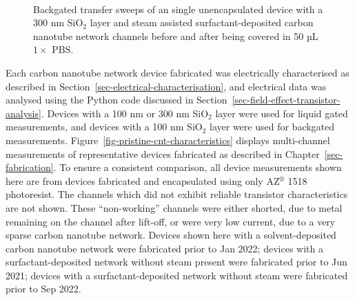 \documentclass[
  a4paper,
]{scrbook}
\begin{document}
\begin{figure}
\begin{minipage}[t]{0.01\linewidth}
{\centering 

~

}

\end{minipage}%

\caption[Backgated transfer sweeps of an single unencapsulated device
before and after exposure to 50 µL \(1 \times\)
PBS.]{\label{fig-buffer-effect-on-backgate}Backgated transfer sweeps of
an single unencapsulated device with a 300 nm SiO\(_2\) layer and steam
assisted surfactant-deposited carbon nanotube network channels before
and after being covered in 50 µL \(1 \times\) PBS.}

\end{figure}

Each carbon nanotube network device fabricated was electrically
characterised as described in
Section~\ref{sec-electrical-characterisation}, and electrical data was
analysed using the Python code discussed in
Section~\ref{sec-field-effect-transistor-analysis}. Devices with a 100
nm or 300 nm SiO\(_2\) layer were used for liquid gated measurements,
and devices with a 100 nm SiO\(_2\) layer were used for backgated
measurements. Figure~\ref{fig-pristine-cnt-characteristics} displays
multi-channel measurements of representative devices fabricated as
described in Chapter~\ref{sec-fabrication}. To ensure a consistent
comparison, all device measurements shown here are from devices
fabricated and encapsulated using only AZ\(^\circledR\) 1518
photoresist. The channels which did not exhibit reliable transistor
characteristics are not shown. These ``non-working'' channels were
either shorted, due to metal remaining on the channel after lift-off, or
were very low current, due to a very sparse carbon nanotube network.
Devices shown here with a solvent-deposited carbon nanotube network were
fabricated prior to Jan 2022; devices with a surfactant-deposited
network without steam present were fabricated prior to Jun 2021; devices
with a surfactant-deposited network without steam were fabricated prior
to Sep 2022.
\end{document}
